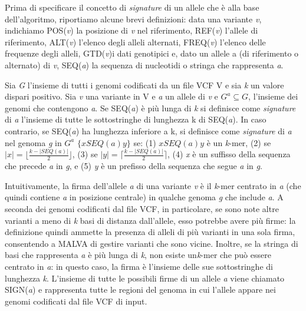 \documentclass[../main.tex]{subfiles}
\begin{document}
Prima di specificare il concetto di \textit{signature} di un allele che è alla base dell'algoritmo, riportiamo alcune brevi definizioni: data una variante \textit{v}, indichiamo POS(\textit{v}) la posizione di \textit{v} nel riferimento, REF(\textit{v}) l'allele di riferimento, ALT(\textit{v}) l'elenco degli alleli alternati, FREQ(\textit{v}) l'elenco delle frequenze degli alleli, GTD(\textit{v})i dati genotipici e, dato un allele a (di riferimento o alternato) di \textit{v}, SEQ(\textit{a}) la sequenza di nucleotidi o stringa che rappresenta \textit{a}.

\theoremstyle{definition}
\begin{definition} 

Sia \textit{G} l'insieme di tutti i genomi codificati da un file VCF V e sia \textit{k} un valore dispari positivo. Sia \textit{v} una variante in V e \textit{a} un allele di \textit{v} e $\textit{G}^{a} \subseteq \textit{G}$, l'insieme dei genomi che contengono \textit{a}. Se SEQ(\textit{a}) è più lunga di \textit{k} si definisce come \textit{signature} di \textit{a} l'insieme di tutte le sottostringhe di lunghezza k di SEQ(\textit{a}). In caso contrario, se SEQ(\textit{a}) ha lunghezza inferiore a k, si definisce come \textit{signature} di \textit{a} nel genoma \textit{g} in $\textit{G}^{a}$ $\{ \textit{x}SEQ(\textit{a})\textit{y} \} $ se: (1) $\textit{x}SEQ(\textit{a})\textit{y}$ è un \textit{k}-mer, (2) se $|\textit{x}| = \lfloor \frac{k-|SEQ(\textit{a})|}{2} \rfloor$, (3) se $|\textit{y}| = \lceil \frac{k-|SEQ(\textit{a})|}{2} \rceil$, (4) \textit{x} è un suffisso della sequenza che precede \textit{a} in \textit{g}, e (5) \textit{y} è un prefisso della sequenza che segue \textit{a} in \textit{g}.

\end{definition}

Intuitivamente, la firma dell'allele \textit{a} di una variante \textit{v} è il \textit{k}-mer centrato in \textit{a} (che quindi contiene \textit{a} in posizione centrale) in qualche genoma \textit{g} che include \textit{a}. A seconda dei genomi codificati dal file VCF, in particolare, se sono note altre varianti a meno di \textit{k} basi di distanza dall'allele, esso potrebbe avere più firme: la definizione quindi ammette la presenza di alleli di più varianti in una sola firma, consentendo a MALVA di gestire varianti che sono vicine. Inoltre, se la stringa di basi che rappresenta \textit{a} è più lunga di \textit{k}, non esiste un\textit{k}-mer che può essere centrato in \textit{a}: in questo caso, la firma è l'insieme delle sue sottostringhe di lunghezza \textit{k}. L'insieme di tutte le possibili firme di un allele \textit{a} viene chiamato SIGN(\textit{a}) e rappresenta tutte le regioni del genoma in cui l'allele appare nei genomi codificati dal file VCF di input.
\end{document}
